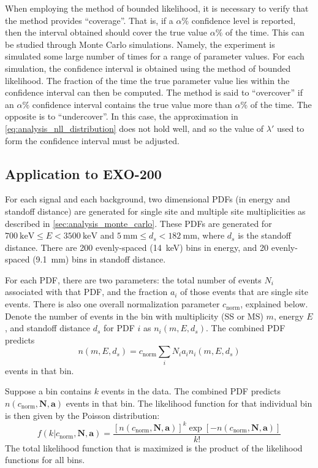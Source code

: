\documentclass[herrin-thesis.tex]{subfiles}
\begin{document}
When employing the method of bounded likelihood, it is necessary to verify that the method provides ``coverage''. That is, if a \(\alpha\%\) confidence level is reported, then the interval obtained should cover the true value \(\alpha\%\) of the time. This can be studied through Monte Carlo simulations. Namely, the experiment is simulated some large number of times for a range of parameter values. For each simulation, the confidence interval is obtained using the method of bounded likelihood. The fraction of the time the true parameter value lies within the confidence interval can then be computed. The method is said to ``overcover'' if an \(\alpha\%\) confidence interval contains the true value more than \(\alpha\%\) of the time. The opposite is to ``undercover''. In this case, the approximation in \cref{eq:analysis_nll_distribution} does not hold well, and so the value of \(\lambda'\) used to form the confidence interval must be adjusted.

\subsection{Application to EXO-200}

For each signal and each background, two dimensional PDFs (in energy and standoff distance) are generated for single site and multiple site multiplicities as described in \cref{sec:analysis_monte_carlo}. These PDFs are generated for \(\SI{700}{\keV} \leq E < \SI{3500}{\keV}\) and \(\SI{5}{\mm} \leq d_s < \SI{182}{\mm}\), where \(d_s\) is the standoff distance. There are 200 evenly-spaced (\SI{14}{\keV}) bins in energy, and 20 evenly-spaced (\SI{9.1}{\mm}) bins in standoff distance.

For each PDF, there are two parameters: the total number of events \(N_i\) associated with that PDF, and the fraction \(a_i\) of those events that are single site events. There is also one overall normalization parameter \(c_\text{norm}\), explained below. Denote the number of events in the bin with multiplicity (SS or MS) \(m\), energy \(E\), and standoff distance \(d_s\) for PDF \(i\) as \(n_i(m, E, d_s)\). The combined PDF predicts
\begin{equation}
n(m, E, d_s) = c_\text{norm}\sum_i N_i a_i n_i(m, E, d_s)
\end{equation}
events in that bin.

Suppose a bin contains \(k\) events in the data. The combined PDF predicts \(n(c_\text{norm}, \mathbf{N}, \mathbf{a})\) events in that bin. The likelihood function for that individual bin is then given by the Poisson distribution:
\begin{equation}
f(k|c_\text{norm}, \mathbf{N}, \mathbf{a}) = \frac{[n(c_\text{norm}, \mathbf{N}, \mathbf{a})]^k \exp[-n(c_\text{norm}, \mathbf{N}, \mathbf{a})]}{k!}
\end{equation}
The total likelihood function that is maximized is the product of the likelihood functions for all bins.
\end{document}
